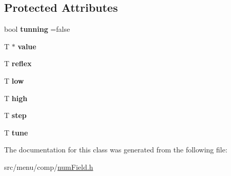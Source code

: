 \subsection*{Protected Attributes}
\begin{DoxyCompactItemize}
\item 
\mbox{\label{classAM5_1_1NumFieldDef_ae044d1714ea3548fa84dde5469a3daea}} 
bool {\bfseries tunning} =false
\item 
\mbox{\label{classAM5_1_1NumFieldDef_aeff4f4b1be119d5e6f53b69689ee96f4}} 
T $\ast$ {\bfseries value}
\item 
\mbox{\label{classAM5_1_1NumFieldDef_afbfd2265830886c10bca7f9a959d390d}} 
T {\bfseries reflex}
\item 
\mbox{\label{classAM5_1_1NumFieldDef_af5629f48235e959f7df7e2c8a523f827}} 
T {\bfseries low}
\item 
\mbox{\label{classAM5_1_1NumFieldDef_aece222a01b367608951454a306905ec6}} 
T {\bfseries high}
\item 
\mbox{\label{classAM5_1_1NumFieldDef_af8670c98e4f00863b18db461b43f3c85}} 
T {\bfseries step}
\item 
\mbox{\label{classAM5_1_1NumFieldDef_a38fbb6639ca9d7df5524350b42268f6a}} 
T {\bfseries tune}
\end{DoxyCompactItemize}


The documentation for this class was generated from the following file\+:\begin{DoxyCompactItemize}
\item 
src/menu/comp/\hyperlink{numField_8h}{num\+Field.\+h}\end{DoxyCompactItemize}
